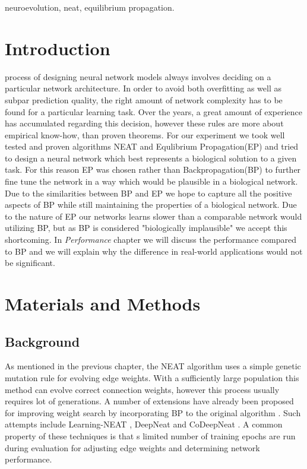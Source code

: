 \documentclass[lettersize,journal]{IEEEtran}
\begin{document}
		
		\begin{IEEEkeywords}
			neuroevolution, neat, equilibrium propagation.
		\end{IEEEkeywords}
		
		\section{Introduction}
		 process of designing neural network models always involves deciding on a particular network architecture. In order to avoid both overfitting as well as subpar prediction quality, the right amount of network complexity has to be found for a particular learning task. Over the years, a great amount of experience has accumulated regarding this decision, however these rules are more about empirical know-how, than proven theorems. For our experiment we took well tested and proven algorithms NEAT and Equlibrium Propagation(EP)\cite{eqprop} and tried to design a neural network which best represents a biological solution to a given task. For this reason EP was chosen rather than Backpropagation(BP)\cite{backprop} to further fine tune the network in a way which would be plausible in a biological network. Due to the similarities between BP and EP we hope to capture all the positive aspects of BP while still maintaining the properties of a biological network. Due to the nature of EP our networks learns slower than a comparable network would utilizing BP, but as BP is considered "biologically implausible" we accept this shortcoming. In \textit{Performance} chapter we will discuss the performance compared to BP and we will explain why the difference in real-world applications would not be significant.
		
		\section{Materials and Methods}
        \subsection{Background}
		As mentioned in the previous chapter, the NEAT algorithm uses a simple genetic mutation rule for evolving edge weights. With a sufficiently large population this method can evolve correct connection weights, however this process usually requires lot of generations. A number of extensions have already been proposed for improving weight search by incorporating BP to the original algorithm \cite{neatsurvey}. Such attempts include Learning-NEAT \cite{lneat}, DeepNeat and CoDeepNeat \cite{codeepneat}. A common property of these techniques is that s limited number of training epochs are run during evaluation for adjusting edge weights and determining network performance. 
		
\end{document}
